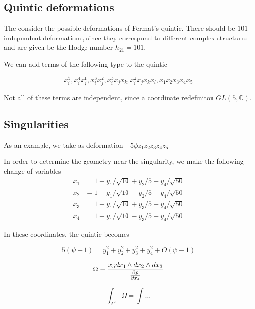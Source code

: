 
\subsection{Quintic deformations}
The consider the possible deformations of Fermat's quintic.
There should be $101$ independent deformations, since they correspond to different complex 
structures and are given be the Hodge number $h_{21}=101$.

We can add terms of the following type to the quintic

\begin{equation}
  x_i^5, x_i^4 x_j^1, x_i^3 x_j^2, x_i^3 x_j x_k, x_i^2 x_j x_k x_l, x_1 x_2 x_3 x_4 x_5
\end{equation}

Not all of these terms are independent, since a coordinate redefiniton $GL(5,\mathbb C)$.




\subsection{Singularities}

As an example, we take as deformation $-5\phi z_1 z_2 z_3 z_4 z_5$




In order to determine the geometry near the singularity, we make the following change of 
variables
\begin{equation}
  \begin{align}
  x_1 &= 1 + y_1/\sqrt{10} + y_2/5 + y_4/\sqrt{50}\\
  x_2 &= 1 + y_1/\sqrt{10} - y_2/5 + y_4/\sqrt{50}\\
  x_3 &= 1 + y_1/\sqrt{10} + y_3/5 - y_4/\sqrt{50}\\
  x_4 &= 1 + y_1/\sqrt{10} - y_3/5 - y_4/\sqrt{50}
  \end{align}
\end{equation}

In these coordinates, the quintic becomes

\begin{equation}
  5(\psi -1 ) =  y_1^2 + y_2^2 + y_3^2 + y_4^2 + O( \psi -1 )
\end{equation}






\begin{equation}
  \Omega = \frac{x_5 dx_1 \wedge dx_2\wedge dx_3}{\pdv{p}{x_4}}
\end{equation}


\begin{equation}
  \int_{A^2} \Omega = \int  \dots
\end{equation}








